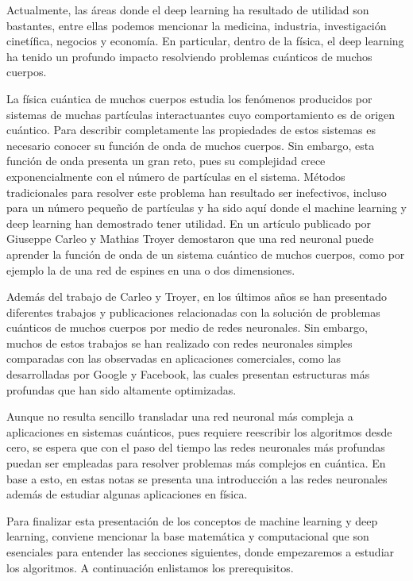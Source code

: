 \documentclass[12pt,oneside,openany]{memoir}
\begin{document}
Actualmente, las áreas donde el deep learning ha resultado de utilidad son bastantes, entre ellas podemos mencionar la medicina, industria, investigación cinetífica, negocios y economía. En particular, dentro de la física, el deep learning ha tenido un profundo impacto resolviendo problemas cuánticos de muchos cuerpos. 

La física cuántica de muchos cuerpos estudia los fenómenos producidos por sistemas de muchas partículas interactuantes cuyo comportamiento es de origen cuántico. Para describir completamente las propiedades de estos sistemas es necesario conocer su función de onda de muchos cuerpos. Sin embargo, esta función de onda presenta un gran reto, pues su complejidad crece exponencialmente con el número de partículas en el sistema. Métodos tradicionales para resolver este problema han resultado ser inefectivos, incluso para un número pequeño de partículas y ha sido aquí donde el machine learning y deep learning han demostrado tener utilidad. En un artículo publicado por Giuseppe Carleo y Mathias Troyer \cite{Carleo17}  demostaron que una red neuronal puede aprender la función de onda de un sistema cuántico de muchos cuerpos, como por ejemplo la de una red de espines en una o dos dimensiones.

Además del trabajo de Carleo y Troyer, en los últimos años se han presentado diferentes trabajos y publicaciones relacionadas con la solución de problemas cuánticos de muchos cuerpos por medio de redes neuronales.  Sin embargo, muchos de estos trabajos se han realizado con redes neuronales simples comparadas con las observadas en aplicaciones comerciales, como las desarrolladas por Google y Facebook, las cuales presentan estructuras más profundas que han sido altamente optimizadas.

Aunque no resulta sencillo transladar una red neuronal más compleja a aplicaciones en sistemas cuánticos, pues requiere reescribir los algoritmos desde cero, se espera que con el paso del tiempo las redes neuronales más profundas puedan ser empleadas para resolver problemas más complejos en cuántica. En base a esto, en estas notas se presenta una introducción a las redes neuronales además de estudiar algunas aplicaciones en física.

Para finalizar esta presentación de los conceptos de machine learning y deep learning, conviene mencionar la base matemática y computacional que son esenciales para entender las secciones siguientes, donde empezaremos a estudiar los algoritmos. A continuación enlistamos los prerequisitos.
\end{document}
